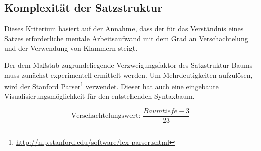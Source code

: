 \documentclass[10pt,a4paper]{article}
\begin{document}
	\subsection*{Komplexität der Satzstruktur}
	Dieses Kriterium basiert auf der Annahme, dass der für das Verständnis eines Satzes erforderliche mentale Arbeitsaufwand mit dem Grad an Verschachtelung und der Verwendung von Klammern steigt. 
	
	Der dem Maßstab zugrundeliegende Verzweigungsfaktor des Satzstruktur-Baums muss zunächst experimentell ermittelt werden. Um Mehrdeutigkeiten aufzulösen, wird der Stanford Parser\footnote{\url{http://nlp.stanford.edu/software/lex-parser.shtml}} verwendet. Dieser hat auch eine eingebaute Visualisierungsmöglichkeit für den entstehenden Syntaxbaum.
	
	\begin{equation*}
		\text{Verschachtelungswert: } \frac{Baumtiefe-3}{23}
	\end{equation*}
		
	
\end{document}
